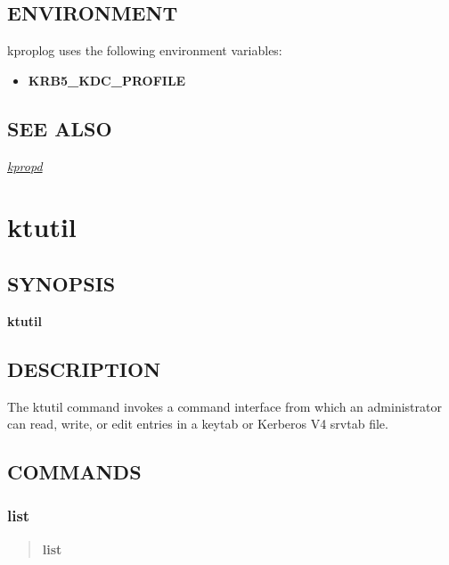 \documentclass[letterpaper,10pt,english]{sphinxmanual}
\begin{document}
\subsection{ENVIRONMENT}
\label{admin/admin_commands/kproplog:environment}
kproplog uses the following environment variables:
\begin{itemize}
\item {} 
\textbf{KRB5\_KDC\_PROFILE}

\end{itemize}


\subsection{SEE ALSO}
\label{admin/admin_commands/kproplog:see-also}
{\hyperref[admin/admin_commands/kpropd:kpropd-8]{\emph{kpropd}}}


\section{ktutil}
\label{admin/admin_commands/ktutil:ktutil-1}\label{admin/admin_commands/ktutil::doc}\label{admin/admin_commands/ktutil:ktutil}

\subsection{SYNOPSIS}
\label{admin/admin_commands/ktutil:synopsis}
\textbf{ktutil}


\subsection{DESCRIPTION}
\label{admin/admin_commands/ktutil:description}
The ktutil command invokes a command interface from which an
administrator can read, write, or edit entries in a keytab or Kerberos
V4 srvtab file.


\subsection{COMMANDS}
\label{admin/admin_commands/ktutil:commands}

\subsubsection{list}
\label{admin/admin_commands/ktutil:list}\begin{quote}

\textbf{list}
\end{quote}
\end{document}
